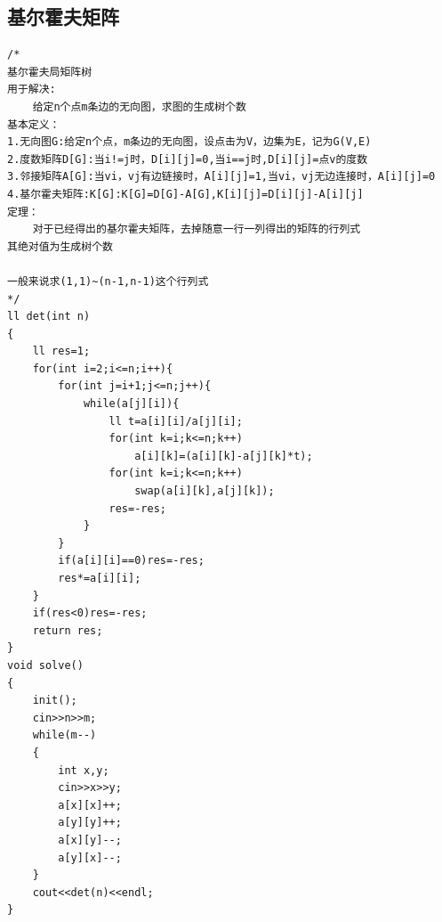 \documentclass[12pt, a4paper, oneside]{ctexart}
\begin{document}
\newpage
\subsection{基尔霍夫矩阵} 
\begin{lstlisting}
/*
基尔霍夫局矩阵树
用于解决:
	给定n个点m条边的无向图，求图的生成树个数
基本定义：
1.无向图G:给定n个点，m条边的无向图，设点击为V，边集为E，记为G(V,E)
2.度数矩阵D[G]:当i!=j时，D[i][j]=0,当i==j时,D[i][j]=点v的度数
3.邻接矩阵A[G]:当vi，vj有边链接时，A[i][j]=1,当vi，vj无边连接时，A[i][j]=0
4.基尔霍夫矩阵:K[G]:K[G]=D[G]-A[G],K[i][j]=D[i][j]-A[i][j]
定理：
	对于已经得出的基尔霍夫矩阵，去掉随意一行一列得出的矩阵的行列式
其绝对值为生成树个数

一般来说求(1,1)~(n-1,n-1)这个行列式
*/
ll det(int n)
{
	ll res=1;
	for(int i=2;i<=n;i++){
		for(int j=i+1;j<=n;j++){
			while(a[j][i]){
				ll t=a[i][i]/a[j][i];
				for(int k=i;k<=n;k++)
					a[i][k]=(a[i][k]-a[j][k]*t);
				for(int k=i;k<=n;k++)
					swap(a[i][k],a[j][k]);
				res=-res;
			}
		}
		if(a[i][i]==0)res=-res;
		res*=a[i][i];
	}
	if(res<0)res=-res;
	return res;
}
void solve()
{
	init();
	cin>>n>>m;
	while(m--)
	{
		int x,y;
		cin>>x>>y;
		a[x][x]++;
		a[y][y]++;
		a[x][y]--;
		a[y][x]--;
	}
	cout<<det(n)<<endl;
}
\end{lstlisting}



\newpage
\end{document}
